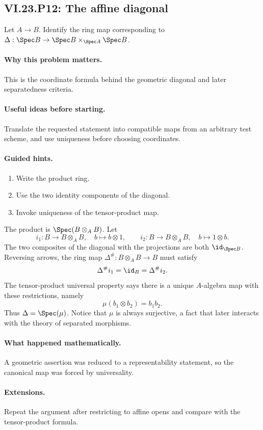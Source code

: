 \subsection*{VI.23.P12: The affine diagonal}
\begin{problem}\label{prob:vi23-p12}
Let $A\to B$. Identify the ring map corresponding to
$\Delta:\Spec B\to\Spec B\times_{\Spec A}\Spec B$.
\end{problem}

\ifdefined\FullProblemDossiers
\paragraph{Why this problem matters.}
This is the coordinate formula behind the geometric diagonal and later separatedness criteria.

\paragraph{Useful ideas before starting.}
Translate the requested statement into compatible maps from an arbitrary test scheme, and use uniqueness before choosing coordinates.

\paragraph{Guided hints.}
\begin{enumerate}
\item Write the product ring.
\item Use the two identity components of the diagonal.
\item Invoke uniqueness of the tensor-product map.
\end{enumerate}

\begin{solution}
The product is $\Spec(B\otimes_AB)$.  Let
\[
i_1:B\to B\otimes_AB,\quad b\mapsto b\otimes1,
\qquad
i_2:B\to B\otimes_AB,\quad b\mapsto1\otimes b.
\]
The two composites of the diagonal with the projections are both $\id_{\Spec B}$.  Reversing
arrows, the ring map $\Delta^\#:B\otimes_AB\to B$ must satisfy
\[
\Delta^\#i_1=\id_B=\Delta^\#i_2.
\]
The tensor-product universal property says there is a unique $A$-algebra map with these
restrictions, namely
\[
\mu(b_1\otimes b_2)=b_1b_2.
\]
Thus $\Delta=\Spec(\mu)$.  Notice that $\mu$ is always surjective, a fact that later interacts
with the theory of separated morphisms.
\end{solution}

\paragraph{What happened mathematically.}
A geometric assertion was reduced to a representability statement, so the canonical map was forced by universality.

\paragraph{Extensions.}
Repeat the argument after restricting to affine opens and compare with the tensor-product formula.
\fi
